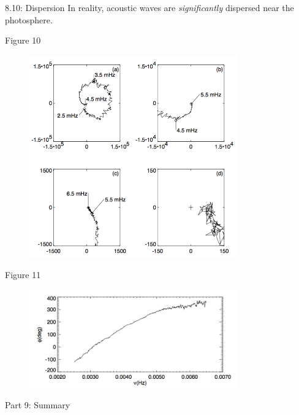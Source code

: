 \documentclass{beamer}
\begin{document}
\begin{frame}{8.10: Dispersion}
    In reality, acoustic waves are \emph{significantly} dispersed
    near the photosphere.
\end{frame}

\begin{frame}{8.9}
\end{frame}

\begin{frame}{8.11}
\end{frame}

\begin{frame}{Figure 10}
    \begin{figure}
        \includegraphics[width=0.8\textwidth]{fig_10.png}
    \end{figure}
\end{frame}

\begin{frame}{Figure 11}
    \begin{figure}
        \includegraphics[width=0.8\textwidth]{fig_11.png}
    \end{figure}
\end{frame}

\begin{frame}{8.12}
\end{frame}

\begin{frame}{8.13}
\end{frame}

\begin{frame}{8.14}
\end{frame}

\begin{frame}{Part 9: Summary}
\end{frame}

\end{document}
